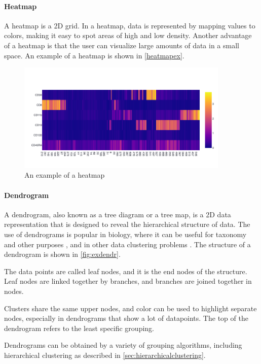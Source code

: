\paragraph{Heatmap}
\label{sec:heatmap}
A heatmap is a 2D grid. In a heatmap, data is represented by mapping values to colors, making it easy to spot areas of high and low density. Another advantage of a heatmap is that the user can visualize large amounts of data in a small space. An example of a heatmap is shown in \ref{heatmapex}.
\begin{figure}[h!]
    \centering
    \includegraphics[width=0.9\textwidth]{Figures/heatmapex.png}
    \caption{An example of a heatmap}
    \label{fig:heatmapex}
\end{figure}

\paragraph{Dendrogram}
\label{sec:dendrogram}
A dendrogram, also known as a tree diagram or a tree map, is a 2D data representation that is designed to reveal the hierarchical structure of data. The use of dendrograms is popular in biology, where it can be useful for taxonomy \citep{calinski2014dendrogram} and other purposes \citep{lee2012persistent, rosolowsky2008structural}, and in other data clustering problems \cite{phipps1971dendrogram}.
The structure of a dendrogram is shown in \ref{fig:exdendr}. 

The data points are called leaf nodes, and it is the end nodes of the structure. Leaf nodes are linked together by branches, and branches are joined together in nodes. 

Clusters share the same upper nodes, and color can be used to highlight separate nodes, especially in dendrograms that show a lot of datapoints. The top of the dendrogram refers to the least specific grouping. 

Dendrograms can be obtained by a variety of grouping algorithms, including hierarchical clustering as described in \ref{sec:hierarchicalclustering}. 

